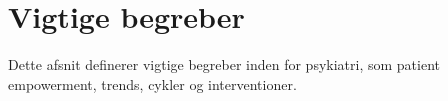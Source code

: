 \chapter{Vigtige begreber}
Dette afsnit definerer vigtige begreber inden for psykiatri, som patient empowerment, trends, cykler og interventioner.